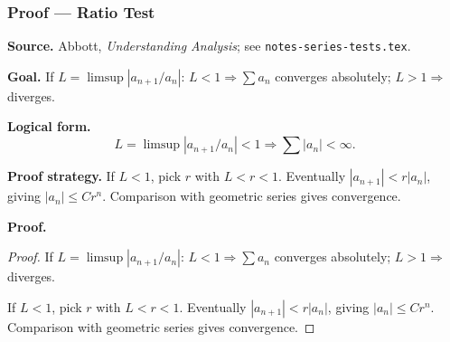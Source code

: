 
\clearpage
{}
\hypertarget{proof-RA-ABB-T-ratio-test}{}

\subsubsection[Ratio Test]{Proof --- Ratio Test}

\bigskip

\noindent
\textbf{Source.}
Abbott, \emph{Understanding Analysis}; see \texttt{notes-series-tests.tex}.

\vspace{0.75em}

\noindent
\textbf{Goal.}
If $L = \limsup |a_{n+1}/a_n|$: $L < 1 \Rightarrow \sum a_n$ converges absolutely; $L > 1 \Rightarrow$ diverges.

\vspace{0.75em}

\noindent
\textbf{Logical form.}
\[
  L = \limsup |a_{n+1}/a_n| < 1 \Rightarrow \sum |a_n| < \infty.
\]

\vspace{0.75em}

\noindent
\textbf{Proof strategy.}
If $L < 1$, pick $r$ with $L < r < 1$. Eventually $|a_{n+1}| < r|a_n|$, giving $|a_n| \le Cr^n$. Comparison with geometric series gives convergence.

\vspace{0.75em}

\noindent
\textbf{Proof.}
\begin{proof}
\Claim If $L = \limsup |a_{n+1}/a_n|$: $L < 1 \Rightarrow \sum a_n$ converges absolutely; $L > 1 \Rightarrow$ diverges.

\Given 

\Goal 

\Strategy If $L < 1$, pick $r$ with $L < r < 1$. Eventually $|a_{n+1}| < r|a_n|$, giving $|a_n| \le Cr^n$. Comparison with geometric series gives convergence.

\medskip


\end{proof}

